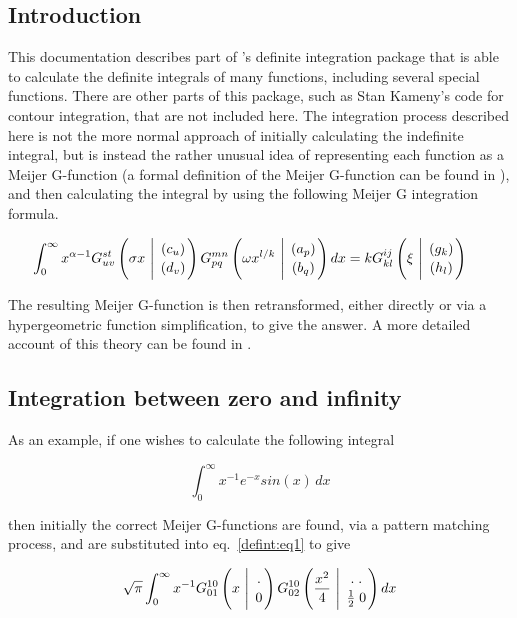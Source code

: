 \newcommand{\MeijerGparams}[2]{\genfrac{}{}{0pt}{}{#1}{#2}}
\subsection{Introduction}
This documentation describes part of \REDUCE's definite
integration package that is able to calculate the definite integrals of
many functions, including several special functions.  There are other
parts of this package, such as Stan Kameny's code for contour integration,
that are not included here.  The integration process described here is not
the more normal approach of initially calculating the indefinite integral,
but is instead the rather unusual idea of representing each function as a
Meijer G-function (a formal definition of the Meijer G-function can be
found in \cite {Prudnikov}), and then calculating the integral by using
the following Meijer G integration formula.

\begin{equation}
\int_{0}^{\infty} x^{\alpha-1} G^{s t}_{u v} 
\left( \sigma x \  \Bigg\vert \  \MeijerGparams{( c_u)}{(d_v)} \right) 
G^{m n}_{p q} \left( \omega x^{l/k} \  \Bigg\vert \ \MeijerGparams{(a_p)}{(b_q)}
\right) dx = k G^{i j}_{k l} \left( \xi \ \Bigg\vert \ 
\MeijerGparams{(g_k)}{(h_l)} \right)  \hspace{5mm} \label{defint:eq1}
\end{equation}

The resulting Meijer G-function is then retransformed, either directly
or via a hypergeometric function simplification, to give
the answer. A more detailed account of this theory can be found in 
\cite {Adamchik:90}.

\subsection{Integration between zero and infinity}

As an example, if one wishes to calculate the following integral

\begin{displaymath}
\int_{0}^{\infty} x^{-1} e^{-x} sin(x) \, dx
\end{displaymath}

then initially the  correct Meijer G-functions are found, via a 
pattern matching 
process, and are substituted into eq.~\ref{defint:eq1} to give

\begin{displaymath}
\sqrt{\pi} \int_{0}^{\infty} x^{-1} G^{1 0}_{0 1} \left(x 
\ \Bigg\vert \ 
\MeijerGparams{.}{0}\right) G^{1 0}_{0 2}\left(\frac{x^{2}}{4} 
\ \Bigg\vert \ \MeijerGparams{. \; . }{\frac{1}{2} \; 0} \right) dx
\end{displaymath}

